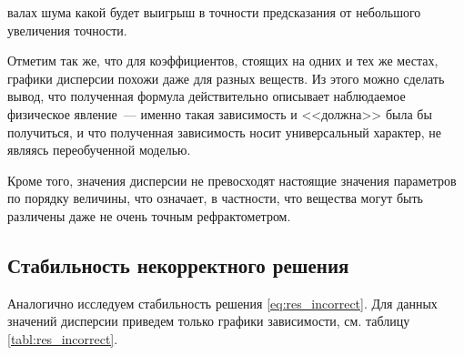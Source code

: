\documentclass[12pt,a4paper]{article}
\begin{document}
валах шума какой будет выигрыш в точности
предсказания от небольшого увеличения точности.

Отметим так же, что для коэффициентов, стоящих на одних и тех же местах, графики дисперсии
похожи даже для разных веществ. Из этого можно сделать вывод, что полученная формула
действительно описывает наблюдаемое физическое явление~--- именно такая зависимость и
<<должна>> была бы получиться, и что полученная зависимость носит универсальный характер,
не являясь переобученной моделью.

Кроме того, значения дисперсии не превосходят настоящие значения параметров по порядку величины,
что означает, в частности, что вещества могут быть различены даже не очень точным рефрактометром.

\subsection{Стабильность некорректного решения}

Аналогично исследуем стабильность решения \eqref{eq:res_incorrect}. Для данных значений дисперсии
приведем только графики зависимости, см. таблицу \ref{tabl:res_incorrect}.
\end{document}
